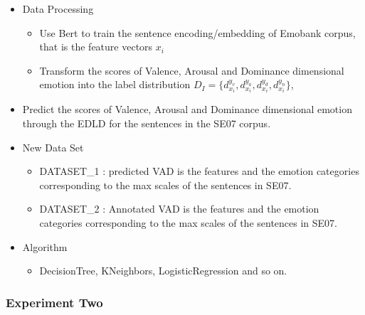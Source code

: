 \begin{itemize}
	\item
	Data Processing
	
	\begin{itemize}
		\item 
		Use Bert to train the sentence encoding/embedding
		of Emobank corpus, that is the feature vectors $ x_{i} $
		\item 
		Transform the scores of Valence, Arousal and Dominance 
		dimensional emotion into 
		the label distribution 
		$ D_{I} = \{d^{y_{v}}_{x_{i}},  d^{y_{a}}_{x_{i}}, d^{y_{d}}_{x_{i}}, d^{y_{n}}_{x_{i}}\} $,
	\end{itemize}
	
	\item 
	Predict the scores of 
	Valence, Arousal and Dominance dimensional emotion
	through the EDLD
	for the sentences in the SE07 corpus.
	
	\item 
	New Data Set
	
	\begin{itemize}
		\item 
		DATASET_1 : predicted VAD is the features and 
		the emotion categories corresponding to 
		the max scales of the sentences in SE07.
		\item 
		DATASET_2 : Annotated VAD is the features and 
		the emotion categories corresponding to 
		the max scales of the sentences in SE07.
	\end{itemize}
	
	\item 
	Algorithm
	
	\begin{itemize}
		\item DecisionTree, KNeighbors, LogisticRegression and so on.
		
	\end{itemize}
\end{itemize}



\subsubsection{Experiment Two}
\

